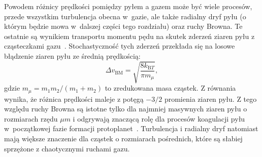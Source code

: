 %
Powodem różnicy prędkości pomiędzy pyłem a gazem może być wiele procesów,
przede wszystkim turbulencja obecna w~gazie, ale także radialny dryf pyłu (o
którym będzie mowa w~dalszej części tego rozdziału) oraz ruchy Browna.  Te
ostatnie są wynikiem transportu momentu pędu na skutek zderzeń ziaren pyłu z
cząsteczkami gazu~\cite{E1905}.  Stochastyczność tych zderzeń przekłada się na
losowe błądzenie ziaren pyłu ze średnią prędkością:
%
\begin{equation}
   \Delta v_{\textrm{BM}} = \sqrt{\frac{8k_{\textrm{B} T}}{\pi m_\mu}},
\label{eq:bm}
\end{equation}
%
gdzie $m_\mu = m_1m_2/(m_1+m_2)$ to zredukowana masa cząstek. Z
równania~ wynika, że różnica prędkości maleje z potęgą $-3/2$
promienia ziaren pyłu. Z tego względu ruchy Browna są istotne tylko dla najmniej
masywnych ziaren pyłu o rozmiarach rzędu $\mu m$ i odgrywają znaczącą rolę dla
procesów koagulacji pyłu w~początkowej fazie formacji protoplanet~\citep{DD05}. 
Turbulencja i radialny dryf natomiast mają większe znaczenie dla cząstek o
rozmiarach pośrednich, które są słabiej sprzężone z chaotycznymi ruchami gazu.


